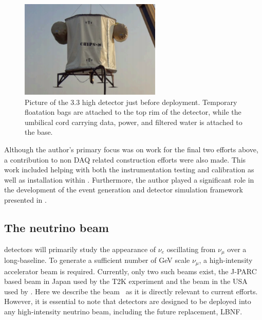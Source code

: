 \begin{figure} %
    \includegraphics[width=0.6\textwidth]{diagrams/4-chips/chips_m.pdf}
    \caption[Picture of the \chipsm detector just before deployment]
    {Picture of the \SI{3.3}{} high \chipsm detector just before deployment. Temporary
        floatation bags are attached to the top rim of the detector, while the umbilical cord
        carrying data, power, and filtered water is attached to the base.}
    \label{fig:chips_m}
\end{figure}

Although the author's primary focus was on work for the final two efforts above, a contribution to
non DAQ related \chipsfive construction efforts were also made. This work included helping with
both the instrumentation testing and calibration as well as installation within \chipsfive.
Furthermore, the author played a significant role in the development of the event generation and
detector simulation framework presented in .

\subsection{The neutrino beam} %
\label{sec:chips_concept_beam} %

\chips detectors will primarily study the appearance of $\nu_{e}$ oscillating from $\nu_{\mu}$
over a long-baseline. To generate a sufficient number of GeV scale $\nu_{\mu}$, a high-intensity
accelerator beam is required. Currently, only two such beams exist, the J-PARC based beam in Japan
used by the T2K experiment and the \numi beam in the USA used by \nova. Here we describe the \numi
beam~\cite{adamson2016} as it is directly relevant to current \chips efforts. However, it is
essential to note that \chips detectors are designed to be deployed into any high-intensity
neutrino beam, including the future \numi replacement, LBNF.

